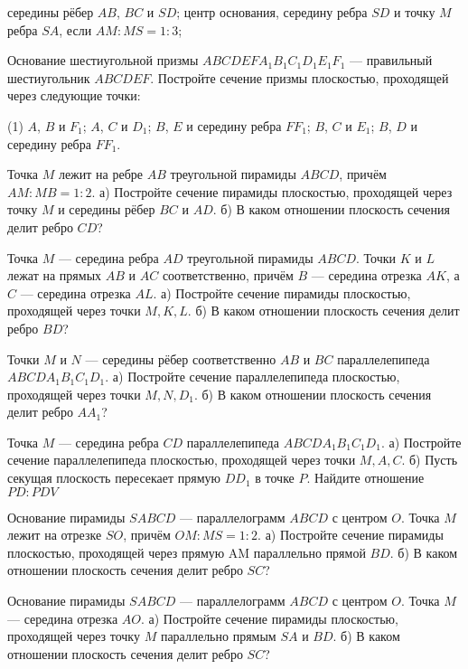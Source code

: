 \begin{class}[number=1]
\begin{listofex}
\begin{tasks}
			\task середины рёбер \( AB \), \( BC \) и \( SD \);
			\task центр основания, середину ребра \( SD \) и точку \( M \) ребра \( SA \),
			если \( AM : MS = 1 : 3 \);
		\end{tasks}
		\newpage
		\item Основание шестиугольной призмы \( ABCDEFA_1B_1C_1D_1E_1F_1 \) ---
		правильный шестиугольник \( ABCDEF \).
		Постройте сечение призмы плоскостью,
		проходящей через следующие точки:
		\begin{tasks}(1)
			\task \( A \), \( B \) и \( F_1 \);
			\task \( A \), \( C \) и \( D_1 \);
			\task \( B \), \( E \) и середину ребра \( FF_1 \);
			\task \( B \), \( C \) и \( E_1 \);
			\task \( B \), \( D \) и середину ребра \( FF_1 \).
	\end{tasks}
	\end{listofex}
\end{class}

\begin{class}[number=2]
	\begin{listofex}
		\item Точка \(M\) лежит на ребре \(AB\) треугольной пирамиды \(ABCD\), причём \(AM : MB = 1:2\). а) Постройте сечение пирамиды плоскостью, проходящей через точку \(M\) и середины рёбер \(BC\) и \(AD\). б) В каком отношении плоскость сечения делит ребро \(CD\)?
		\item Точка \(M\) — середина ребра \(AD\) треугольной пирамиды \(ABCD\). Точки \(K\) и \(L\) лежат на прямых \(AB\) и \(AC\) соответственно, причём \(B\) --- середина отрезка \(AK\), а \(C\) — середина отрезка \(AL\). а) Постройте сечение пирамиды плоскостью, проходящей через точки \(M, K, L\). б) В каком отношении плоскость сечения делит ребро \(BD\)?
		\item Точки \(M\) и \(N\) — середины рёбер соответственно \(AB\) и \(BC\) параллелепипеда \(ABCDA_1B_1C_1D_1\).
		а) Постройте сечение параллелепипеда плоскостью, проходящей через точки \(M, N, D_1\). б) В каком отношении плоскость сечения делит ребро \(AA_1\)?
		\item Точка \(M\) — середина ребра \(CD\) параллелепипеда \(ABCDA_1B_1C_1D_1\). а) Постройте сечение параллелепипеда плоскостью, проходящей через точки \(M, A, C\). б) Пусть секущая плоскость пересекает прямую \(DD_1\) в точке \(P\). Найдите отношение \(PD:PDV\)
		\item Основание пирамиды \(SABCD\) — параллелограмм \(ABCD\) с центром \(O\). Точка \(M\) лежит на отрезке \(SO\), причём \(OM:MS = 1:2\). а) Постройте сечение пирамиды плоскостью, проходящей через прямую AM параллельно прямой \(BD\). б) В каком отношении плоскость сечения делит ребро \(SC\)?
		\item Основание пирамиды \(SABCD\) — параллелограмм \(ABCD\) с центром \(O\). Точка \(M\) — середина отрезка \(AO\). а) Постройте сечение пирамиды плоскостью, проходящей через точку \(M\) параллельно прямым \(SA\) и \(BD\). б) В каком отношении плоскость сечения делит ребро \(SC\)?
	\end{listofex}
\end{class}

